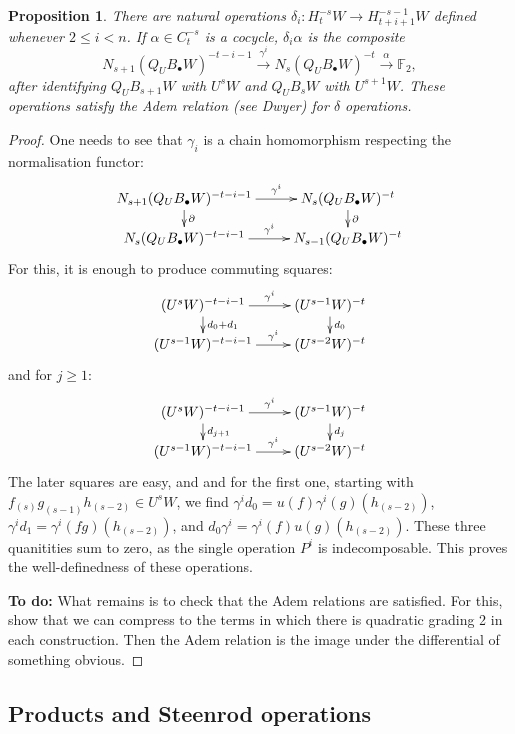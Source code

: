 \documentclass[11pt]{amsart}
\theoremstyle{plain}
\newtheorem{prop}[thm]{Proposition}
\theoremstyle{definition}
\renewcommand{\to}{\longrightarrow}
\theoremstyle{plain}
\newcommand{\F}{\mathbb{F}}
\begin{document}
\begin{prop}
There are natural operations $\delta_i:H^{-s}_tW\to H^{-s-1}_{t+i+1}W$ defined whenever $2\leq i <n$. If $\alpha\in C^{-s}_t$ is a cocycle, $\delta_i\alpha$ is the composite
\[N_{s+1}(Q_U B_{\bullet}W)^{-t-i-1}\overset{\gamma^i}{\to}N_s(Q_U B_{\bullet}W)^{-t}\overset{\alpha}{\to}\F_2,\]
after identifying $Q_U B_{s+1}W$ with $U^{s}W$ and $Q_U B_{s}W$ with $U^{s+1}W$. These operations satisfy the Adem relation (see Dwyer) for $\delta$ operations.
\end{prop}
\begin{proof}
One needs to see that $\gamma_i$ is a chain homomorphism respecting the normalisation functor:\[\xymatrix@R=4mm{
N_{s+1}(Q_U B_{\bullet}W)^{-t-i-1}\ar[r]^-{\gamma^i}
\ar[d]^-{\partial}&%
N_s(Q_U B_{\bullet}W)^{-t}
\ar[d]^-{\partial}
\\%
N_{s}(Q_U B_{\bullet}W)^{-t-i-1}\ar[r]^-{\gamma^i}&%
N_{s-1}(Q_U B_{\bullet}W)^{-t}%
}\]
For this, it is enough to produce commuting squares:
\[\xymatrix@R=4mm{
(U^sW)^{-t-i-1}\ar[r]^-{\gamma^i}
\ar[d]^-{d_0+d_1}&%
(U^{s-1}W)^{-t}
\ar[d]^-{d_0}
\\%
(U^{s-1}W)^{-t-i-1}\ar[r]^-{\gamma^i}&%
(U^{s-2}W)^{-t}%
}\]
and for $j\geq1$:
\[\xymatrix@R=4mm{
(U^sW)^{-t-i-1}\ar[r]^-{\gamma^i}
\ar[d]^-{d_{j+1}}&%
(U^{s-1}W)^{-t}
\ar[d]^-{d_j}
\\%
(U^{s-1}W)^{-t-i-1}\ar[r]^-{\gamma^i}&%
(U^{s-2}W)^{-t}%
}\]
The later squares are easy, and and for the first one, starting with $f_{(s)}g_{(s-1)}h_{(s-2)}\in U^sW$, we find $\gamma^i d_0=u(f)\gamma^i (g)(h_{(s-2)})$,
$\gamma^i d_1=\gamma^i (fg)(h_{(s-2)})$, and
$d_0\gamma^i =\gamma^i (f)u(g)(h_{(s-2)})$. These three quanitities sum to zero, as the single operation $P^i$ is indecomposable. This proves the well-definedness of these operations.

\textbf{To do:} What remains is to check that the Adem relations are satisfied. For this, show that we can compress to the terms in which there is quadratic grading 2 in each construction. Then the Adem relation is the image under the differential of something obvious.
\end{proof}

\subsection{Products and Steenrod operations}
\end{document}
